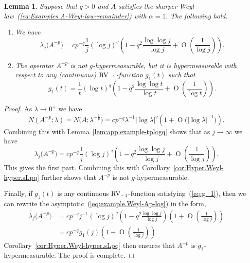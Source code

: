 \documentclass[10pt, a4paper]{amsart}
\newcommand{\op}{\operatorname}
\numberwithin{equation}{section}
\newtheorem{lemma}[theorem]{Lemma}
\theoremstyle{definition}
\theoremstyle{remark}
\newcommand{\RV}{\textup{RV}}
\begin{document}
\begin{lemma}\label{lem:distribution asymptotic with remainder}
 Suppose that $q>0$ and  $A$ satisfies the sharper Weyl law~(\ref{eq:Examples.A-Weyl-law-remainder}) with $\alpha=1$. The following hold.
\begin{enumerate}
 \item[(i)] We have
 \begin{equation*}
 \lambda_j\big(A^{-p}\big) =cp^{-q} \frac{1}{j} (\log j)^q\left(1- q^2\frac{\log\log j}{\log j}+ \op{O}\left (\frac{1}{\log j}\right)\right).
\end{equation*}

\item[(ii)] The operator $A^{-p}$ is not $g$-hypermeasurable, but it is hypermeasurable with respect to any (continuous) $\RV_{-1}$-function $g_1(t)$ such that
\begin{equation}\label{eq:g_1}
 g_1(t)=\frac{1}{t}(\log t)^q\left(1-q^2\frac{\log\log t}{\log t} + \op{O}\left(\frac{1}{\log t}\right)\right).
\end{equation}
 \end{enumerate}
\end{lemma}
\begin{proof}
As $\lambda \rightarrow 0^+$ we have
\begin{equation*}
N\left(A^{-p};\lambda\right)= N\big(A;\lambda^{-\frac{1}{p}}\big) = cp^{-q} \lambda^{-1} |\log \lambda|^q  \left( 1+ \op{O}\big(|\log \lambda|^{-1}\big)\right).
\end{equation*}
Combining this with Lemma~\ref{lem:app.example-tplogq} shows that as $j\rightarrow \infty$ we have
\begin{equation}\label{eq:example.Weyl-Ap-log}
 \lambda_j\big(A^{-p}\big) = cp^{-q} \frac{1}{j} (\log j)^q\left(1- q^2\frac{\log\log j}{\log j}+  \op{O}\left (\frac{1}{\log j}\right)\right).
\end{equation}
This gives the first part. Combining this with Corollary~\ref{cor:Hyper.Weyl-hyper.sLpq} further shows that $A^{-p}$ is not $g$-hypermeasurable.

Finally, if $g_1(t)$ is any continuous $\RV_{-1}$-function satisfying~(\ref{eq:g_1}), then we can rewrite the asymptotic~(\ref{eq:example.Weyl-Ap-log}) in the form,
\begin{align*}
  \lambda_j\big(A^{-p}\big) &= cp^{-q} j^{-1} (\log j)^q\left(1- q^2\frac{\log\log j}{\log j}\right) \left(1+ \op{O}\left (\frac{1}{\log j}\right)\right) \\
  &= cp^{-q} g_1(j) \left(1+ \op{O}\left (\frac{1}{\log j}\right)\right).
\end{align*}
Corollary~\ref{cor:Hyper.Weyl-hyper.sLpq} then ensures that $A^{-p}$ is $g_1$-hypermeasurable. The proof is complete.
\end{proof}
\end{document}
